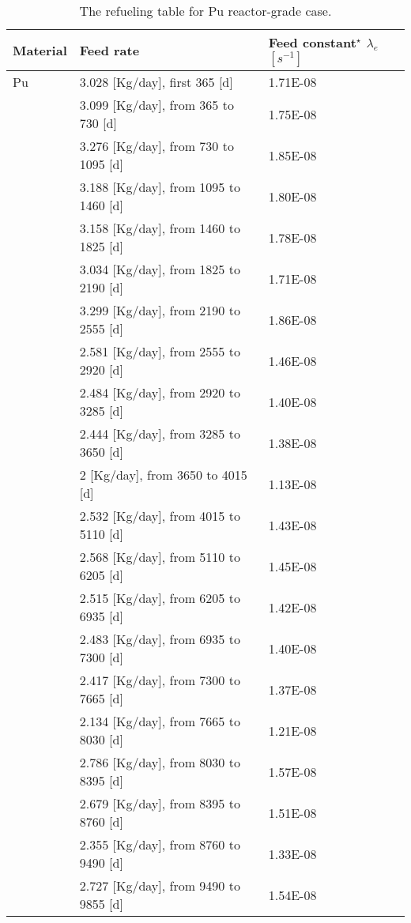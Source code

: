 \newpage
\begin{longtable}{|p{}|p{}|p{}|}
	\caption{The refueling table for Pu reactor-grade case.} 
	\vspace{-0.2in}
	\label{tab:table9}
	\endfirsthead
	\endhead
		\hline
		\textbf{Material} & \textbf{Feed rate} & \textbf{Feed 
		constant$^{\star}$} $\lambda_{e}$ $[s^{-1}]$ \\
		\hline
		Pu        &  3.028 [Kg/day], first 365 [d] & 1.71E-08 \\
		&  3.099 [Kg/day], from 365 to 730 [d] & 		1.75E-08 \\
		&  3.276 [Kg/day], from 730 to 1095 [d] & 		1.85E-08 \\
		&  3.188 [Kg/day], from 1095 to 1460 [d]& 		1.80E-08	\\
		&  3.158 [Kg/day], from 1460 to 1825 [d] &		1.78E-08	\\
		& 3.034 [Kg/day], from 1825 to 2190 [d] &		1.71E-08	\\
		& 3.299   [Kg/day], from 2190 to 2555 [d] &	1.86E-08	\\
		&  2.581  [Kg/day], from 2555 to 2920 [d]&		1.46E-08		\\
		&  2.484  [Kg/day], from 2920 to 3285 [d]&		1.40E-08	 \\ 
		&  2.444  [Kg/day], from 3285 to 3650 [d]&		1.38E-08	 \\ 
		&   2 [Kg/day], from 3650 to 4015 [d]&		1.13E-08	 \\ 
		&  2.532  [Kg/day], from 4015 to 5110 [d]&		1.43E-08	 \\
		&  2.568  [Kg/day], from 5110 to 6205 [d]&		1.45E-08	 \\
		&  2.515  [Kg/day], from 6205 to 6935 [d]&		1.42E-08	 \\
		& 2.483 [Kg/day], from 6935 to 7300 [d]&		1.40E-08	 \\
		&  2.417  [Kg/day], from 7300 to 7665 [d]&		1.37E-08	 \\
		&  2.134  [Kg/day], from 7665 to 8030 [d]&		1.21E-08	 \\
		&  2.786  [Kg/day], from 8030 to 8395 [d]&		1.57E-08	 \\
		&   2.679 [Kg/day], from 8395 to 8760 [d]&		1.51E-08	 \\
		&  2.355   [Kg/day], from 8760 to 9490 [d]&		1.33E-08	 \\
		&  2.727  [Kg/day], from 9490 to 9855 [d]&		1.54E-08	 \\

\end{longtable}

